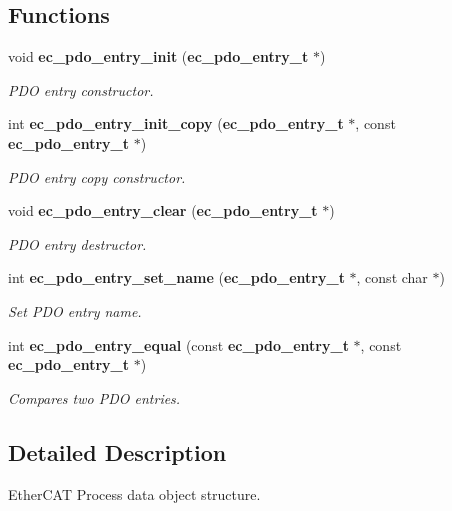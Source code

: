 \subsection*{\-Functions}
\begin{DoxyCompactItemize}
\item 
void {\bf ec\-\_\-pdo\-\_\-entry\-\_\-init} ({\bf ec\-\_\-pdo\-\_\-entry\-\_\-t} $\ast$)\label{pdo__entry_8h_a535f77bcfcff9801c4e15a0b80dc59f0}

\begin{DoxyCompactList}\small\item\em \-P\-D\-O entry constructor. \end{DoxyCompactList}\item 
int {\bf ec\-\_\-pdo\-\_\-entry\-\_\-init\-\_\-copy} ({\bf ec\-\_\-pdo\-\_\-entry\-\_\-t} $\ast$, const {\bf ec\-\_\-pdo\-\_\-entry\-\_\-t} $\ast$)
\begin{DoxyCompactList}\small\item\em \-P\-D\-O entry copy constructor. \end{DoxyCompactList}\item 
void {\bf ec\-\_\-pdo\-\_\-entry\-\_\-clear} ({\bf ec\-\_\-pdo\-\_\-entry\-\_\-t} $\ast$)\label{pdo__entry_8h_a71dbe7740b835cb199a93485b45de1ff}

\begin{DoxyCompactList}\small\item\em \-P\-D\-O entry destructor. \end{DoxyCompactList}\item 
int {\bf ec\-\_\-pdo\-\_\-entry\-\_\-set\-\_\-name} ({\bf ec\-\_\-pdo\-\_\-entry\-\_\-t} $\ast$, const char $\ast$)
\begin{DoxyCompactList}\small\item\em \-Set \-P\-D\-O entry name. \end{DoxyCompactList}\item 
int {\bf ec\-\_\-pdo\-\_\-entry\-\_\-equal} (const {\bf ec\-\_\-pdo\-\_\-entry\-\_\-t} $\ast$, const {\bf ec\-\_\-pdo\-\_\-entry\-\_\-t} $\ast$)
\begin{DoxyCompactList}\small\item\em \-Compares two \-P\-D\-O entries. \end{DoxyCompactList}\end{DoxyCompactItemize}


\subsection{\-Detailed \-Description}
\-Ether\-C\-A\-T \-Process data object structure. 

